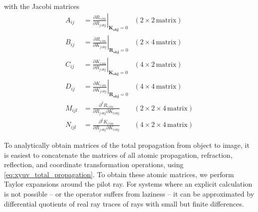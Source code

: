 \documentclass[12pt,a4paper,twoside,openright,BCOR10mm,headsepline,titlepage,abstracton,chapterprefix,final]{scrreprt}
\newcommand\Vector[1]{{\mathbf{#1}}}
\newcommand\obj{\textrm{obj}}
\begin{document}
with the Jacobi matrices
\begin{align}
 A_{ij} &=
   \left.
     \frac{\partial R_{i\,im}}{\partial R_{j\,obj}} 
   \right|_{\Vector{K_\obj}=0}
   & (2\times2 \,\textrm{matrix})
 \\
 B_{ij} &=
   \left.
     \frac{\partial R_{i\,im}}{\partial K_{j\,obj}} 
   \right|_{\Vector{R_\obj}=0}
   & (2\times4 \,\textrm{matrix})
 \\
 C_{ij} &=
   \left.
     \frac{\partial K_{i\,im}}{\partial R_{j\,obj}} 
   \right|_{\Vector{K_\obj}=0}
   & (4\times2 \,\textrm{matrix})
 \\
 D_{ij} &=
   \left.
     \frac{\partial K_{i\,im}}{\partial K_{j\,obj}} 
   \right|_{\Vector{R_\obj}=0}
   & (4\times4 \,\textrm{matrix})
 \\
 M_{ijl} &=
     \frac{\partial^2 R_{i\,im}}{\partial R_{j\,obj}\partial K_{l\,obj}} 
   & (2\times2\times4 \,\textrm{matrix})
 \\
 N_{ijl} &=
     \frac{\partial^2 K_{i\,im}}{\partial R_{j\,obj}\partial K_{l\,obj}} 
   & (4\times2\times4 \,\textrm{matrix})
\end{align}


To analytically obtain matrices of the total propagation from object to image, 
it is easiest to concatenate the matrices of all atomic propagation, refraction, reflection, and coordinate transformation operations,
using \eqref{eq:xyuv_total_propagation}.
To obtain these atomic matrices, we perform Taylor expansions around the pilot ray.
For systems where an explicit calculation is not possible
-- or the operator suffers from laziness --
it can be approximated by differential quotients of real ray traces of rays with small but finite differences.
\end{document}
